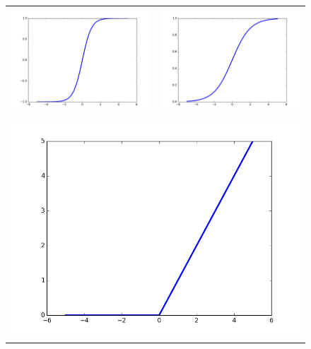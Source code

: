 \begin{figure}
\begin{center}
\begin{tabular}{cc}
\includegraphics[scale=0.25]{images/chapter1/tanh.png} & \includegraphics[scale=0.25]{images/chapter1/s.png} \\
\multicolumn{2}{c}{\includegraphics[scale=0.25]{images/chapter1/relu.png}}

\end{tabular}
\end{center}
\end{figure}
